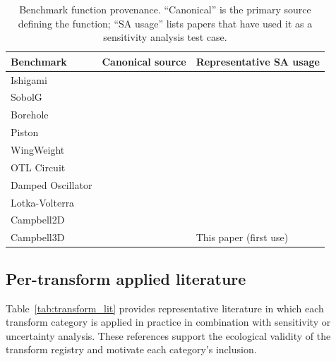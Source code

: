\documentclass[11pt,onecolumn]{article}
\begin{document}
\begin{table}[H]
\centering
\caption{Benchmark function provenance. ``Canonical'' is the primary source
defining the function; ``SA usage'' lists papers that have used it as a
sensitivity analysis test case.}
\label{tab:bench_provenance}
\small
\begin{tabular}{p{2.6cm}p{3.0cm}p{7.5cm}}
\toprule
Benchmark & Canonical source & Representative SA usage \\
\midrule
Ishigami & \citet{Ishigami1990} & \citet{Saltelli2002,Sudret2008,Puy2022} \\
SobolG & \citet{SobolLevitan1999} & \citet{Saltelli2002,Blatman2011,Puy2022} \\
Borehole & \citet{MorrisMitchell1993} & \citet{Saltelli2008,Forrester2008,Puy2022} \\
Piston & \citet{BenAriSteinberg2007} & \citet{Saltelli2008,Puy2022} \\
WingWeight & \citet{Forrester2008} & \citet{Saltelli2008,Puy2022} \\
OTL Circuit & \citet{BenAriSteinberg2007} & \citet{Saltelli2008,Puy2022} \\
Damped Oscillator & \citet{Sudret2008} & \citet{Lamboni2011,Blatman2011} \\
Lotka-Volterra & \citet{Lotka1925,Volterra1926} & \citet{Saltelli2005,Campolongo2011} \\
Campbell2D & \citet{MarrelSpatial2011} & \citet{Marrel2011,Buzzard2012} \\
Campbell3D & \citet{Hettinger2025c3d} & This paper (first use) \\
\bottomrule
\end{tabular}
\end{table}

\subsection{Per-transform applied literature}

Table~\ref{tab:transform_lit} provides representative literature in which each
transform category is applied in practice in combination with sensitivity or
uncertainty analysis.  These references support the ecological validity of the
transform registry and motivate each category's inclusion.
\end{document}

